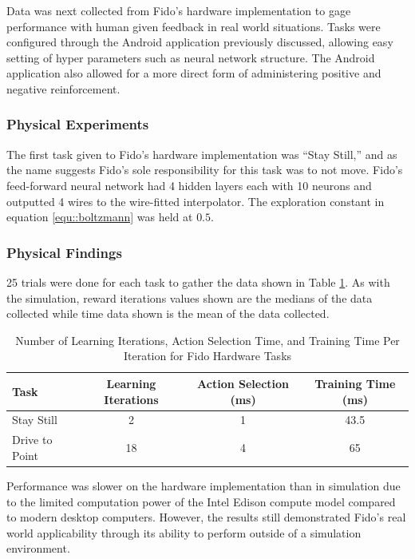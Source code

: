 Data was next collected from Fido's hardware implementation to gage performance with human given feedback in real world situations.  Tasks were configured through the Android application previously discussed, allowing easy setting of hyper parameters such as neural network structure.  The Android application also allowed for a more direct form of administering positive and negative reinforcement. 

\subsubsection{Physical Experiments}

The first task given to Fido's hardware implementation was ``Stay Still,'' and as the name suggests Fido's sole responsibility for this task was to not move.  Fido's feed-forward neural network had 4 hidden layers each with 10 neurons and outputted 4 wires to the wire-fitted interpolator. The exploration constant in equation \ref{equ::boltzmann} was held at $0.5$.

\subsubsection{Physical Findings}

25 trials were done for each task to gather the data shown in Table \ref{tab:data2}.  As with the simulation, reward iterations values shown are the medians of the data collected while time data shown is the mean of the data collected.

\begin{table}[ht]
	\centering
	\begin{tabular}{@{}lccc@{}}
		\toprule
		Task             & Learning Iterations & Action Selection (ms) & Training Time (ms) \\ \midrule
		Stay Still       & 2                   & 1                    & 43.5                  \\
		Drive to Point   & 18                  & 4                     & 65                  \\
	\end{tabular}
	\caption{Number of Learning Iterations, Action Selection Time, and Training Time Per Iteration for Fido Hardware Tasks}
	\label{tab:data2}
\end{table}

Performance was slower on the hardware implementation than in simulation due to the limited computation power of the Intel Edison compute model compared to modern desktop computers.  However, the results still demonstrated Fido's real world applicability through its ability to perform outside of a simulation environment.
